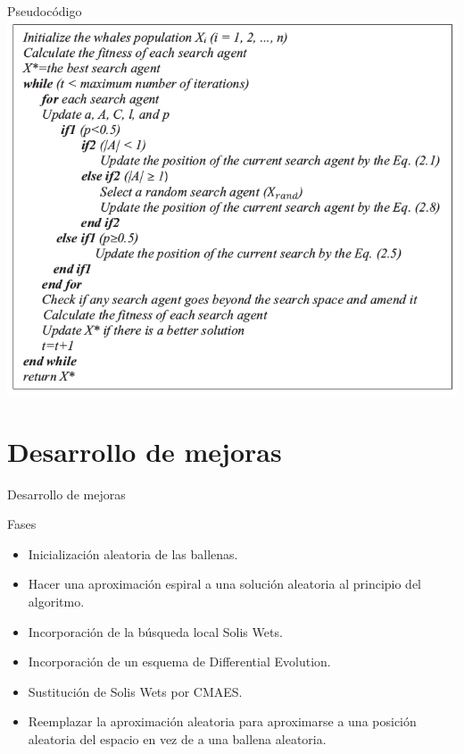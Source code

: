 \documentclass[10pt]{beamer}
\begin{document}
	\begin{frame}[fragile]{Pseudocódigo}
		\includegraphics[scale=0.4]{./Imagenes/imagen4.png}
	\end{frame}

\section{Desarrollo de mejoras}

	\begin{frame}[fragile]{Desarrollo de mejoras}
		\vspace{10px}
		\pause
		\begin{block}{Fases}
			\begin{itemize}
				\item Inicialización aleatoria de las ballenas.
				\item Hacer una aproximación espiral a una solución aleatoria al principio del algoritmo.
				\item Incorporación de la búsqueda local Solis Wets.
				\item Incorporación de un esquema de Differential Evolution.
				\item Sustitución de Solis Wets por CMAES.
				\item Reemplazar la aproximación aleatoria para aproximarse a una posición aleatoria del espacio en vez de a una ballena aleatoria.
			\end{itemize}
		\end{block}
	\end{frame}
\end{document}
